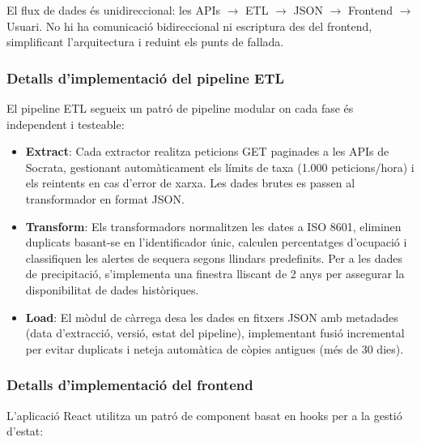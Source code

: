 El flux de dades és unidireccional: les APIs $\rightarrow$ ETL $\rightarrow$ JSON $\rightarrow$ Frontend $\rightarrow$ Usuari. No hi ha comunicació bidireccional ni escriptura des del frontend, simplificant l'arquitectura i reduint els punts de fallada.

\subsubsection{Detalls d'implementació del pipeline ETL}

El pipeline ETL segueix un patró de pipeline modular on cada fase és independent i testeable:

\begin{itemize}
    \item \textbf{Extract}: Cada extractor realitza peticions GET paginades a les APIs de Socrata, gestionant automàticament els límits de taxa (1.000 peticions/hora) i els reintents en cas d'error de xarxa. Les dades brutes es passen al transformador en format JSON.
    
    \item \textbf{Transform}: Els transformadors normalitzen les dates a ISO 8601, eliminen duplicats basant-se en l'identificador únic, calculen percentatges d'ocupació i classifiquen les alertes de sequera segons llindars predefinits. Per a les dades de precipitació, s'implementa una finestra lliscant de 2 anys per assegurar la disponibilitat de dades històriques.
    
    \item \textbf{Load}: El mòdul de càrrega desa les dades en fitxers JSON amb metadades (data d'extracció, versió, estat del pipeline), implementant fusió incremental per evitar duplicats i neteja automàtica de còpies antigues (més de 30 dies).
\end{itemize}

\subsubsection{Detalls d'implementació del frontend}

L'aplicació React utilitza un patró de component basat en hooks per a la gestió d'estat:

